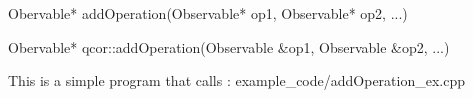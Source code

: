 
\begin{apidefinition}

\begin{Csynopsis}
    Obervable* addOperation(Observable* op1, Observable* op2, ...)
\end{Csynopsis}

\begin{Cppsynopsis}
    Obervable* qcor::addOperation(Observable &op1, Observable &op2, ...)
\end{Cppsynopsis}


\begin{apiarguments}
\end{apiarguments}



\apinotes{
    
}

\begin{apiexamples}

\apicppexample
    { This is a simple program that calls : } 
    { example_code/addOperation_ex.cpp} 
    {}

\end{apiexamples}

\end{apidefinition}
